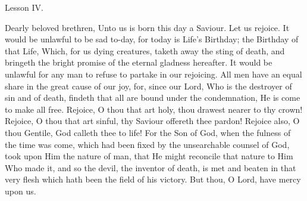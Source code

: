 {  \bigskip{}
  {


  }

  {
    \hfil{Lesson IV.}\hfil

    \begin{parcolumns}[rulebetween,colwidths={1=.42\linewidth}]{2}
    {Dearly beloved brethren, Unto us is born this day a Saviour. Let us rejoice. It would be unlawful to be sad to-day, for today is Life's Birthday; the Birthday of that Life, Which, for us dying creatures, taketh away the sting of death, and bringeth the bright promise of the eternal gladness hereafter. It would be unlawful for any man to refuse to partake in our rejoicing. All men have an equal share in the great cause of our joy, for, since our Lord, Who is the destroyer of sin and of death, findeth that all are bound under the condemnation, He is come to make all free. Rejoice, O thou that art holy, thou drawest nearer to thy crown! Rejoice, O thou that art sinful, thy Saviour offereth thee pardon! Rejoice also, O thou Gentile, God calleth thee to life! For the Son of God, when the fulness of the time was come, which had been fixed by the unsearchable counsel of God, took upon Him the nature of man, that He might reconcile that nature to Him Who made it, and so the devil, the inventor of death, is met and beaten in that very flesh which hath been the field of his victory.
      But thou, O Lord, have mercy upon us.}
    \end{parcolumns}

  }

  {
    \bigskip
    \medskip

}}
